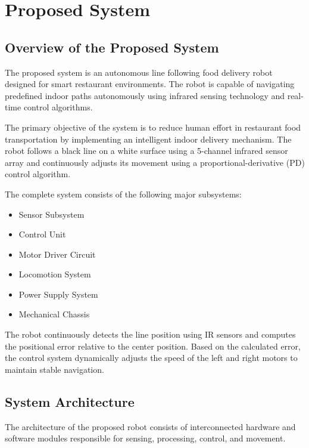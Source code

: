 \documentclass[12pt,a4paper,oneside]{report}
\begin{document}
\chapter{Proposed System}

\section{Overview of the Proposed System}

The proposed system is an autonomous line following food delivery robot designed for smart restaurant environments. The robot is capable of navigating predefined indoor paths autonomously using infrared sensing technology and real-time control algorithms.

The primary objective of the system is to reduce human effort in restaurant food transportation by implementing an intelligent indoor delivery mechanism. The robot follows a black line on a white surface using a 5-channel infrared sensor array and continuously adjusts its movement using a proportional-derivative (PD) control algorithm.

The complete system consists of the following major subsystems:

\begin{itemize}
\item Sensor Subsystem
\item Control Unit
\item Motor Driver Circuit
\item Locomotion System
\item Power Supply System
\item Mechanical Chassis
\end{itemize}

The robot continuously detects the line position using IR sensors and computes the positional error relative to the center position. Based on the calculated error, the control system dynamically adjusts the speed of the left and right motors to maintain stable navigation.


\section{System Architecture}

The architecture of the proposed robot consists of interconnected hardware and software modules responsible for sensing, processing, control, and movement.
\end{document}
